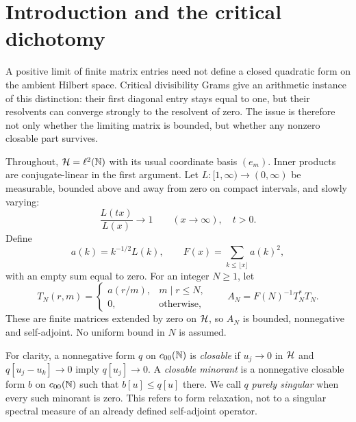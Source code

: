 \section{Introduction and the critical dichotomy}
\label{sec:introduction}

A positive limit of finite matrix entries need not define a closed
quadratic form on the ambient Hilbert space. Critical divisibility Grams
give an arithmetic instance of this distinction: their first diagonal
entry stays equal to one, but their resolvents can converge strongly to
the resolvent of zero. The issue is therefore not only whether the
limiting matrix is bounded, but whether any nonzero closable part survives.

Throughout, $\mathcal{H}=\ell^2(\mathbb{N})$ with its usual coordinate basis $(e_m)$.
Inner products are conjugate-linear in the first argument.
Let $L:[1,\infty)\to(0,\infty)$ be measurable, bounded above and away
from zero on compact intervals, and slowly varying:
\begin{equation}
 \frac{L(tx)}{L(x)}\longrightarrow1
 \qquad(x\to\infty),\quad t>0.
 \label{eq:slow}
\end{equation}
Define
\begin{equation}
 a(k)=k^{-1/2}L(k),\qquad
 F(x)=\sum_{k\le \lfloor x\rfloor}a(k)^2,
 \label{eq:coefficients}
\end{equation}
with an empty sum equal to zero. For an integer $N\ge1$, let
\begin{equation}
 T_N(r,m)=
 \begin{cases}
 a(r/m),&m\mid r\le N,\\
 0,&\text{otherwise},
 \end{cases}
 \qquad
 A_N=F(N)^{-1}T_N^*T_N.
 \label{eq:gram-definition}
\end{equation}
These are finite matrices extended by zero on $\mathcal{H}$, so $A_N$ is bounded,
nonnegative and self-adjoint. No uniform bound in $N$ is assumed.

For clarity, a nonnegative form $q$ on $c_{00}(\mathbb{N})$ is \emph{closable} if
$u_j\to0$ in $\mathcal{H}$ and $q[u_j-u_k]\to0$ imply $q[u_j]\to0$.
A \emph{closable minorant} is a nonnegative closable form $b$ on $c_{00}(\mathbb{N})$
such that $b[u]\le q[u]$ there. We call $q$ \emph{purely singular} when
every such minorant is zero. This refers to form relaxation, not to a
singular spectral measure of an already defined self-adjoint operator.

